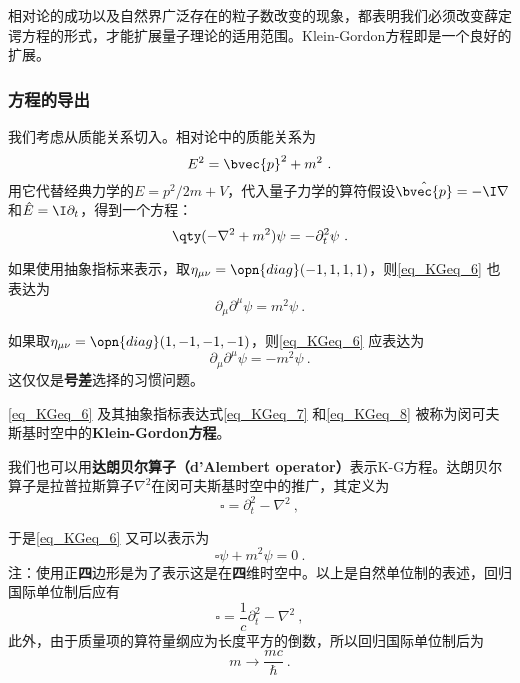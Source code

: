 相对论的成功以及自然界广泛存在的粒子数改变的现象，都表明我们必须改变薛定谔方程的形式，才能扩展量子理论的适用范围。Klein-Gordon方程即是一个良好的扩展。

\subsubsection{方程的导出}

我们考虑从质能关系切入。相对论中的质能关系为
\begin{equation}
E^2=\bvec{p}^2+m^2~.
\end{equation}
用它代替经典力学的$E=p^2/2m+V$，代入量子力学的算符假设$\hat{\bvec{p}}=-\I\nabla$和$\hat{E}=\I\partial_t$，得到一个方程：
\begin{equation}\label{eq_KGeq_6}
\qty(-\nabla^2+m^2)\psi = -\partial_t^2 \psi~.
\end{equation}

如果使用抽象指标来表示，取$\eta_{\mu\nu}=\opn{diag}(-1, 1, 1, 1)$，则\autoref{eq_KGeq_6} 也表达为
\begin{equation}\label{eq_KGeq_7}
\partial_\mu\partial^\mu \psi = m^2\psi~.
\end{equation}

如果取$\eta_{\mu\nu}=\opn{diag}(1, -1, -1, -1)$，则\autoref{eq_KGeq_6} 应表达为
\begin{equation}\label{eq_KGeq_8}
\partial_\mu\partial^\mu \psi = -m^2\psi~.
\end{equation}
这仅仅是\textbf{号差}选择的习惯问题。

\autoref{eq_KGeq_6} 及其抽象指标表达式\autoref{eq_KGeq_7} 和\autoref{eq_KGeq_8} 被称为闵可夫斯基时空中的\textbf{Klein-Gordon方程}。

我们也可以用\textbf{达朗贝尔算子（d'Alembert operator）}表示K-G方程。达朗贝尔算子是拉普拉斯算子$\nabla^2$在闵可夫斯基时空中的推广，其定义为
\begin{equation}
\square = \partial_t^2-\nabla^2~,
\end{equation}


于是\autoref{eq_KGeq_6} 又可以表示为
\begin{equation}
\square \psi + m^2\psi = 0~.
\end{equation}
注：使用正\textbf{四}边形是为了表示这是在\textbf{四}维时空中。以上是自然单位制的表述，回归国际单位制后应有
\begin{equation}
\square = \frac{1}{c}\partial_t^2-\nabla^2~,
\end{equation}
此外，由于质量项的算符量纲应为长度平方的倒数，所以回归国际单位制后为
\begin{equation}
m\rightarrow \frac{mc}{\hbar}~.
\end{equation}


